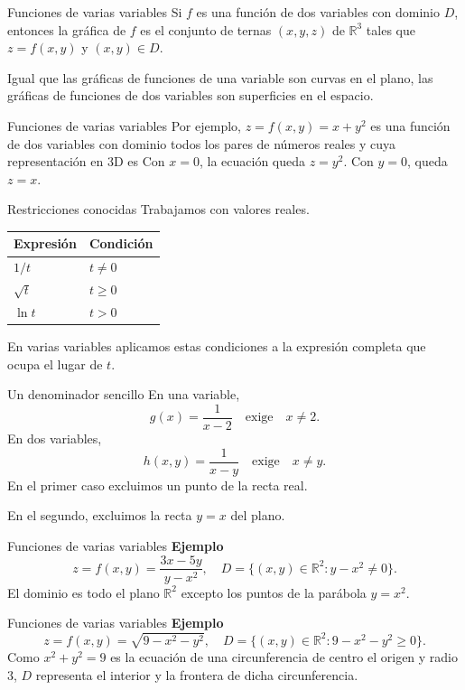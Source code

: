 \begin{frame}{Funciones de varias variables}
\small Si $f$ es una función de dos variables con dominio $D$, entonces la gráfica de $f$ es el conjunto de ternas $(x,y,z)$ de $\mathbb{R}^3$ tales que $z=f(x,y)$ y $(x,y)\in D$.
\medskip

Igual que las gráficas de funciones de una variable son curvas en el plano, las gráficas de funciones de dos variables son superficies en el espacio.
\end{frame}
\begin{frame}{Funciones de varias variables}
Por ejemplo, $z=f(x,y)=x+y^2$ es una función de dos variables con dominio todos los pares de números reales y cuya representación en 3D es
Con $x=0$, la ecuación queda $z=y^2$. Con $y=0$, queda $z=x$.
\end{frame}
\begin{frame}{Restricciones conocidas}
Trabajamos con valores reales.
\begin{center}\begin{tabular}{ll}
Expresión & Condición\\\hline
$1/t$ & $t\ne0$\\[3mm]
$\sqrt t$ & $t\ge0$\\[3mm]
$\ln t$ & $t>0$
\end{tabular}\end{center}
En varias variables aplicamos estas condiciones a la expresión completa que ocupa el lugar de $t$.
\end{frame}
\begin{frame}{Un denominador sencillo}
En una variable,
\[g(x)=\frac1{x-2}\quad\text{exige}\quad x\ne2.\]
En dos variables,
\[h(x,y)=\frac1{x-y}\quad\text{exige}\quad x\ne y.\]
En el primer caso excluimos un punto de la recta real.

En el segundo, excluimos la recta $y=x$ del plano.
\end{frame}
\begin{frame}{Funciones de varias variables}
\textbf{Ejemplo}
\[z=f(x,y)=\frac{3x-5y}{y-x^2},\quad D=\{(x,y)\in\mathbb{R}^2:y-x^2\ne0\}.\]
El dominio es todo el plano $\mathbb{R}^2$ excepto los puntos de la parábola $y=x^2$.
\end{frame}
\begin{frame}{Funciones de varias variables}
\textbf{Ejemplo}
\[z=f(x,y)=\sqrt{9-x^2-y^2},\quad D=\{(x,y)\in\mathbb{R}^2:9-x^2-y^2\ge0\}.\]
\small Como $x^2+y^2=9$ es la ecuación de una circunferencia de centro el origen y radio $3$, $D$ representa el interior y la frontera de dicha circunferencia.
\end{frame}

